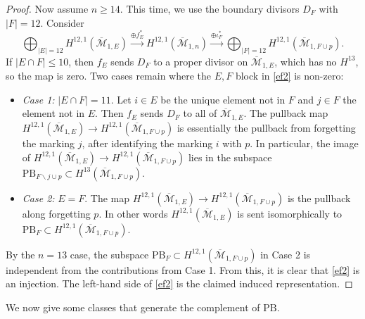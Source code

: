 \documentclass[12pt]{amsart}
\theoremstyle{definition}
\numberwithin{equation}{section}
\newcommand{\M}{\mathcal{M}}
\newcommand{\Mb}{\overline{\M}}
\newcommand{\pb}{\mathrm{PB}}
\theoremstyle{definition} %
\theoremstyle{remark}
\begin{document}
\begin{proof}
Now assume $n \geq 14$. This time, we use the boundary divisors $D_F$ with $|F| = 12$. Consider
\begin{equation} \label{ef2}
\bigoplus_{|E| = 12} H^{12,1}(\Mb_{1,E}) \xrightarrow{\oplus f_E^*} H^{12,1}(\Mb_{1,n})  \xrightarrow{\oplus \iota_F^*} \bigoplus_{|F| = 12} H^{12,1}(\Mb_{1,F \cup p}).
\end{equation}
If $|E \cap F| \leq 10$, then $f_E$ sends $D_F$ to a proper divisor on $\Mb_{1,E}$, which has no $H^{13}$, so the map is zero. Two cases remain where the $E, F$ block in \eqref{ef2} is non-zero:
\begin{itemize}
\item \textit{Case 1:} $|E \cap F| = 11$. Let $i \in E$ be the unique element not in $F$ and $j \in F$ the element not in $E$. Then $f_E$ sends $D_F$ to all of $\Mb_{1,E}$. The pullback map $H^{12,1}(\Mb_{1,E}) \to H^{12,1}(\Mb_{1,F \cup p})$ is essentially the pullback from forgetting the marking $j$, after identifying the marking $i$ with $p$. In particular, the image of $H^{12,1}(\Mb_{1,E}) \to H^{12,1}(\Mb_{1,F \cup p})$ lies in the subspace $\pb_{F \smallsetminus j \cup p} \subset H^{13}(\Mb_{1, F \cup p})$.
\item \textit{Case 2:} $E = F$. The map $H^{12,1}(\Mb_{1,E}) \to H^{12,1}(\Mb_{1,F \cup p})$ is the pullback along forgetting $p$. In other words $H^{12,1}(\Mb_{1,E})$ is sent isomorphically to $\pb_F \subset H^{12,1}(\Mb_{1,F \cup p})$.
\end{itemize}
By the $n = 13$ case, the subspace $\pb_F \subset H^{12,1}(\Mb_{1,F \cup p})$ in Case 2 is independent from the contributions from Case 1. From this, it is clear that \eqref{ef2} is an injection. The left-hand side of \eqref{ef2} is the claimed induced representation.
\end{proof}

We now give some classes that generate the complement of $\mathrm{PB}$.
\end{document}
